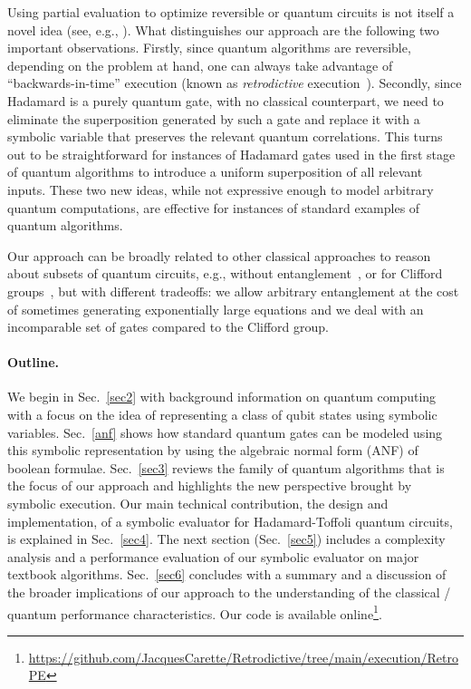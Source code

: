 \documentclass[sigplan,screen]{acmart}
\theoremstyle{definition}
\begin{document}
Using partial evaluation to optimize reversible or quantum circuits is
not itself a novel idea (see, e.g.,
\cite{10.1007/978-3-319-63390-9_1,10.1145/1929501.1929506}). What
distinguishes our approach are the following two important
observations. Firstly, since quantum algorithms are reversible,
depending on the problem at hand, one can always take advantage of
``backwards-in-time'' execution (known as \emph{retrodictive}
execution~\cite{RevModPhys.27.179,sym13040586,retrodictive,Aharonov2008}). Secondly,
since Hadamard is a purely quantum gate, with no classical
counterpart, we need to eliminate the superposition generated by such
a gate and replace it with a symbolic variable that preserves the
relevant quantum correlations. This turns out to be straightforward
for instances of Hadamard gates used in the first stage of quantum
algorithms to introduce a uniform superposition of all relevant
inputs. These two new ideas, while not expressive enough to model arbitrary
quantum computations, are effective for instances of standard examples
of quantum algorithms.

Our approach can be broadly related to other
classical approaches to reason about subsets of quantum circuits,
e.g., without entanglement~\cite{10.1145/3563309}, or for Clifford
groups~\cite{osti_319738,DBLP:journals/corr/abs-1805-06908}, but with
different tradeoffs: we allow arbitrary entanglement at the cost of
sometimes generating exponentially large equations and we deal
with an incomparable set of gates compared to the Clifford group. 

\paragraph*{Outline.} We begin in Sec.~\ref{sec2} with background
information on quantum computing with a focus on the idea of
representing a class of qubit states using symbolic
variables. Sec.~\ref{anf} shows how standard quantum gates can be
modeled using this symbolic representation by using the algebraic
normal form (ANF) of boolean formulae. Sec.~\ref{sec3} reviews the
family of quantum algorithms that is the focus of our approach and
highlights the new perspective brought by symbolic execution. Our main
technical contribution, the design and implementation, of a symbolic
evaluator for Hadamard-Toffoli quantum circuits, is explained in
Sec.~\ref{sec4}. The next section (Sec.~\ref{sec5}) includes a
complexity analysis and a performance evaluation of our symbolic
evaluator on major textbook algorithms. Sec.~\ref{sec6} concludes with
a summary and a discussion of the broader implications of our approach
to the understanding of the classical / quantum performance
characteristics. Our code is available online\footnote{
  \url{https://github.com/JacquesCarette/Retrodictive/tree/main/execution/RetroPE}}.
\end{document}
